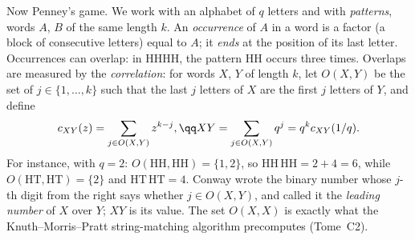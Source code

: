 Now Penney's game. We work with an alphabet of $q$ letters and with \emph{patterns}, words $A$, $B$ of the same length $k$. An \emph{occurrence} of $A$ in a
word is a factor (a block of consecutive letters) equal to $A$; it \emph{ends} at the position of its last letter. Occurrences can overlap:
in HHHH, the pattern HH occurs three times. Overlaps are measured by the \emph{correlation}: for words $X$, $Y$ of length $k$, let
$O(X,Y)$ be the set of $j\in\{1,\dots,k\}$ such that the last $j$ letters of $X$ are the first $j$ letters of $Y$, and define
\[
\begin{gathered}c_{XY}(z)=\sum_{j\in O(X,Y)}z^{k-j},\qq XY=\sum_{j\in O(X,Y)}q^j=q^kc_{XY}(1/q).\end{gathered}
\]
For instance, with $q=2$: $O(\mathrm{HH},\mathrm{HH})=\{1,2\}$, so $\mathrm{HH\,HH}=2+4=6$, while $O(\mathrm{HT},\mathrm{HT})=\{2\}$ and $\mathrm{HT\,HT}=4$. Conway wrote the binary number
whose $j$-th digit from the right says whether $j\in O(X,Y)$, and called it the \emph{leading number} of $X$ over $Y$; $XY$ is its value. The set $O(X,X)$
is exactly what the Knuth--Morris--Pratt string-matching algorithm precomputes (Tome~C2).

